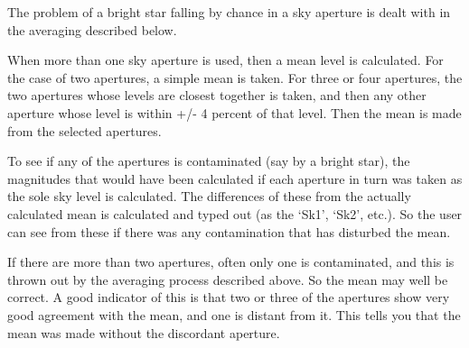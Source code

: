 {{ The problem of a bright star falling by chance in a sky aperture
 is dealt with in the averaging described below.

\vspace*{2mm}{\bf   Mean Level Used }\vspace*{2mm}

 When more than one sky aperture is used, then a mean level is
 calculated. For the case of two apertures, a simple mean is
 taken. For three or four apertures, the two apertures whose
 levels are closest together is taken, and then any other
 aperture whose level is within +/- 4 percent of that level.
 Then the mean is made from the selected apertures.

\vspace*{2mm}{\bf    Record of Differences }\vspace*{2mm}

 To see if any of the apertures is contaminated (say by a bright
 star), the magnitudes that would have been calculated if each
 aperture in turn was taken as the sole sky level is calculated.
 The differences of these from the actually calculated mean is
 calculated and typed out (as the `Sk1', `Sk2', etc.). So the
 user can see from these if there was any contamination that has
 disturbed the mean. 

 If there are more than two apertures, often only one is contaminated, 
 and this is thrown out by the averaging process described above. So 
 the mean may well be correct. A good indicator of this is that two or
 three of the apertures show very good agreement with the mean, and 
 one is distant from it. This tells you that the mean was made without
 the discordant aperture.

}}
